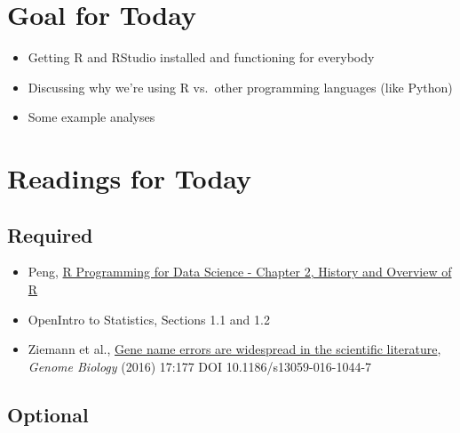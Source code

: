 \documentclass[
]{book}
\providecommand{\tightlist}{%
  \setlength{\itemsep}{0pt}\setlength{\parskip}{0pt}}
\begin{document}
\hypertarget{goal-for-today-1}{%
\section*{Goal for Today}\label{goal-for-today-1}}

\begin{itemize}
\tightlist
\item
  Getting R and RStudio installed and functioning for everybody
\item
  Discussing why we're using R vs.~other programming languages (like Python)
\item
  Some example analyses
\end{itemize}

\hypertarget{readings-for-today-1}{%
\section*{Readings for Today}\label{readings-for-today-1}}

\hypertarget{required-1}{%
\subsection*{Required}\label{required-1}}

\begin{itemize}
\tightlist
\item
  Peng, \href{https://bookdown.org/rdpeng/rprogdatascience/history-and-overview-of-r.html}{R Programming for Data Science - Chapter 2, History and Overview of R}
\item
  OpenIntro to Statistics, Sections 1.1 and 1.2
\item
  Ziemann et al., \href{https://genomebiology.biomedcentral.com/track/pdf/10.1186/s13059-016-1044-7.pdf}{Gene name errors are widespread in the
  scientific literature}, \emph{Genome Biology} (2016) 17:177
  DOI 10.1186/s13059-016-1044-7
\end{itemize}

\hypertarget{optional-1}{%
\subsection*{Optional}\label{optional-1}}
\end{document}
